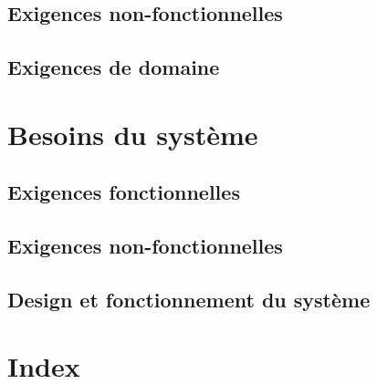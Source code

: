 \documentclass{article}
\begin{document}
    \subsection{Exigences non-fonctionnelles}
    \subsection{Exigences de domaine}

\section{Besoins du système}
    \subsection{Exigences fonctionnelles}
    \subsection{Exigences non-fonctionnelles}
    \subsection{Design et fonctionnement du système}

\section{Index}
\end{document}
